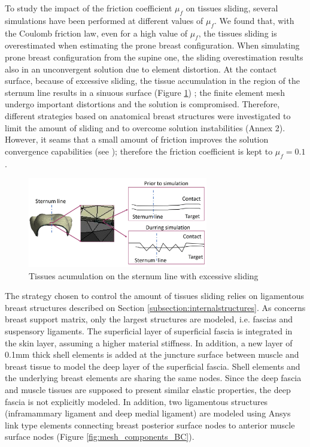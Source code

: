To study the impact of the friction coefficient $\mu_f$ on tissues sliding, several simulations have been performed at different values of $\mu_f$. We found that, with the Coulomb friction law, even for a high value of $\mu_f$, the tissues sliding is overestimated when estimating the prone breast configuration. When simulating prone breast configuration from the supine one, the sliding overestimation results also in an unconvergent solution due to element distortion. At the contact surface, because of excessive sliding, the tissue accumulation in the region of the sternum line results in a sinuous surface (Figure \ref{fig:overslidingProblem}) ; the finite element mesh  undergo important distortions and the solution is compromised. Therefore, different strategies based on anatomical breast structures were investigated to limit the amount of sliding and to overcome solution instabilities (Annex 2). However, it seams that a small amount of friction improves the solution convergence capabilities (see \cite{ansys_contact_2017}); therefore the friction coefficient is kept to $\mu_f = 0.1$. 
\begin{figure}[!h]
\centering
\includegraphics[width=0.7\textwidth,keepaspectratio]{figures/overslidingProblem.jpg} 
\caption{Tissues acumulation on the sternum line with excessive sliding}\label{fig:overslidingProblem}
\end{figure}
 
The strategy chosen to control the amount of tissues sliding relies on ligamentous breast structures described on Section \ref{subsection:internalstructures}. As concerns breast support matrix, only the largest structures are modeled, i.e. fascias and suspensory ligaments.  The superficial layer of superficial fascia is integrated in the skin layer, assuming a higher material stiffness. In addition, a new layer of 0.1mm thick shell elements is added at the juncture surface between muscle and breast tissue to model the deep layer of the superficial fascia. Shell elements and the underlying breast elements are sharing the same nodes. Since the deep fascia and muscle tissues are supposed to present similar elastic properties, the deep fascia is not explicitly modeled. In addition, two ligamentous structures (inframammary ligament and deep medial ligament) are modeled using Ansys link type elements connecting breast posterior surface nodes to anterior muscle surface nodes (Figure \ref{fig:mesh_components_BC}).  



